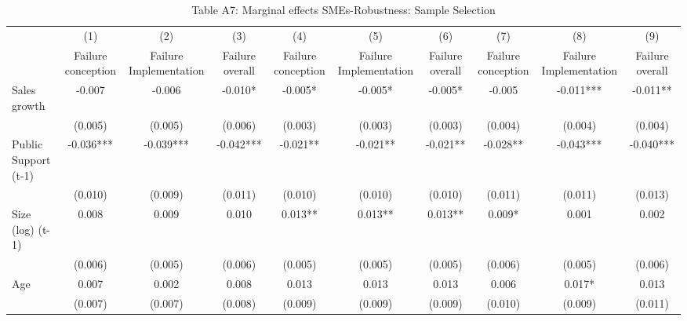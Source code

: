 \begin{table}[htbp]\centering
\def\sym#1{\ifmmode^{#1}\else\(^{#1}\)\fi}
\caption{{Table A7: Marginal effects SMEs-Robustness: Sample Selection}}
\begin{tabular}{l*{9}{c}}
\hline\hline
                    &\multicolumn{1}{c}{(1)}&\multicolumn{1}{c}{(2)}&\multicolumn{1}{c}{(3)}&\multicolumn{1}{c}{(4)}&\multicolumn{1}{c}{(5)}&\multicolumn{1}{c}{(6)}&\multicolumn{1}{c}{(7)}&\multicolumn{1}{c}{(8)}&\multicolumn{1}{c}{(9)}\\
                    &\multicolumn{1}{c}{Failure conception}&\multicolumn{1}{c}{Failure Implementation}&\multicolumn{1}{c}{Failure overall}&\multicolumn{1}{c}{Failure conception}&\multicolumn{1}{c}{Failure Implementation}&\multicolumn{1}{c}{Failure overall}&\multicolumn{1}{c}{Failure conception}&\multicolumn{1}{c}{Failure Implementation}&\multicolumn{1}{c}{Failure overall}\\
\hline
Sales growth        &      -0.007   &      -0.006   &      -0.010*  &      -0.005*  &      -0.005*  &      -0.005*  &      -0.005   &      -0.011***&      -0.011** \\
                    &     (0.005)   &     (0.005)   &     (0.006)   &     (0.003)   &     (0.003)   &     (0.003)   &     (0.004)   &     (0.004)   &     (0.004)   \\
Public Support (t-1)&      -0.036***&      -0.039***&      -0.042***&      -0.021** &      -0.021** &      -0.021** &      -0.028** &      -0.043***&      -0.040***\\
                    &     (0.010)   &     (0.009)   &     (0.011)   &     (0.010)   &     (0.010)   &     (0.010)   &     (0.011)   &     (0.011)   &     (0.013)   \\
Size (log) (t-1)    &       0.008   &       0.009   &       0.010   &       0.013** &       0.013** &       0.013** &       0.009*  &       0.001   &       0.002   \\
                    &     (0.006)   &     (0.005)   &     (0.006)   &     (0.005)   &     (0.005)   &     (0.005)   &     (0.006)   &     (0.005)   &     (0.006)   \\
Age                 &       0.007   &       0.002   &       0.008   &       0.013   &       0.013   &       0.013   &       0.006   &       0.017*  &       0.013   \\
                    &     (0.007)   &     (0.007)   &     (0.008)   &     (0.009)   &     (0.009)   &     (0.009)   &     (0.010)   &     (0.009)   &     (0.011)   \\

\end{tabular}
\end{table}
